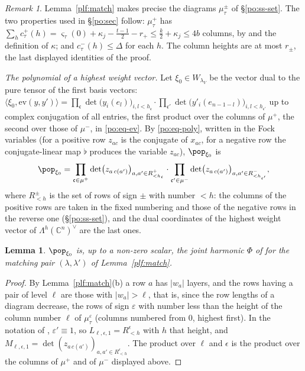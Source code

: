 \documentclass[10pt]{amsart}
\newtheorem{lemma}[theorem]{Lemma}
\theoremstyle{definition}
\theoremstyle{remark}
\newtheorem{remark}[theorem]{Remark}
\newcommand{\C}{\mathbb C}
\begin{document}
\begin{remark}\label{plf:rem-mu}
Lemma~\ref{plf:match} makes precise the diagrams $\mu^\pm_\tau$ of \S\ref{po:ss-set}. The two properties used in
\S\ref{po:sec} follow: $\mu^+_\tau$ has $\sum_hc^+_\tau(h)=\varsigma_\tau(0)+\kappa_j-\frac{t-1}2-r_+
\le\frac k2+\kappa_j\le4b$ columns, by {\cite[(38)]{P46}} and the definition of $\kappa$; and
$c^-_\tau(h)\le\Delta$ for each $h$. The column heights are at most $r_\pm$, the last displayed
identities of the proof.
\end{remark}

\emph{The polynomial of a highest weight vector.} Let $\xi_0\in W_{\lambda_V}$ be the vector dual
to the pure tensor of the first basis vectors: $\langle\xi_0,\mathrm{ev}(y,y')\rangle=\prod_{\mathfrak
c}\det\bigl(y_{i}(e_{l})\bigr)_{i,l<h_{\mathfrak c}}\cdot\prod_{\mathfrak c'}\det\bigl(y'_{i}(e_{n-1-l})
\bigr)_{i,l<h_{\mathfrak c'}}$ up to complex conjugation of all entries, the first product over the
columns of $\mu^+$, the second over those of $\mu^-$, in \eqref{po:eq-ev}. By \eqref{po:eq-poly},
written in the Fock variables (for a positive row $z_{ac}$ is the conjugate of $x_{ac}$, for a
negative row the conjugate-linear map $\flat$ produces the variable $z_{ac}$), $\pop_{\xi_0}$ is
\[
\pop_{\xi_0}=\prod_{\mathfrak c\in\mu^+}\det\bigl(z_{a\,c(a')}\bigr)_{a,a'\in R^+_{<h_{\mathfrak c}}}
\cdot\prod_{\mathfrak c'\in\mu^-}\det\bigl(z_{a\,c(a')}\bigr)_{a,a'\in R^-_{<h_{\mathfrak c'}}},
\]
where $R^\pm_{<h}$ is the set of rows of sign $\pm$ with number $<h$: the columns of the positive
rows are taken in the fixed numbering and those of the negative rows in the reverse one
(\S\ref{po:ss-set}), and the dual coordinates of the highest weight vector of $\Lambda^h(\C^n)^\vee$
are the last ones.

\begin{lemma}\label{plf:harm}
$\pop_{\xi_0}$ is, up to a non-zero scalar, the joint harmonic $\Phi$ of
{\cite[Proposition~3.11]{P49}} for the matching pair $(\lambda,\lambda')$ of Lemma~\ref{plf:match}.
\end{lemma}
\begin{proof}
By Lemma~\ref{plf:match}(b) a row $a$ has $|w_a|$ layers, and the rows having a pair of level
$\ell$ are those with $|w_a|>\ell$, that is, since the row lengths of a diagram decrease, the rows
of sign $\varepsilon$ with number less than the height of the column number $\ell$ of
$\mu^{\varepsilon}_\tau$ (columns numbered from $0$, highest first). In the notation of
{\cite[Proposition~3.11]{P49}}, $\varepsilon'\equiv1$, so $L_{\ell,\epsilon,1}=R^{\epsilon}_{<h}$ with
$h$ that height, and $M_{\ell,\epsilon,1}=\det(z_{a\,c(a')})_{a,a'\in R^\epsilon_{<h}}$. The product
over $\ell$ and $\epsilon$ is the product over the columns of $\mu^+$ and of $\mu^-$ displayed
above.
\end{proof}
\end{document}
